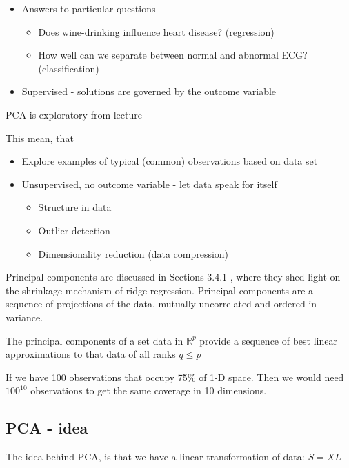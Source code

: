 \begin{itemize}
  \item Answers to particular questions
  \begin{itemize}
    \item Does wine-drinking influence heart disease? (regression)
    \item How well can we separate between normal and abnormal ECG? (classification)
  \end{itemize}
  \item Supervised - solutions are governed by the outcome variable
\end{itemize}

PCA is exploratory from lecture \cite[p.~8]{lecture6}

This mean, that

\begin{itemize}
  \item Explore examples of typical (common) observations based on data set
  \item Unsupervised, no outcome variable - let data speak for itself
  \begin{itemize}
    \item Structure in data
    \item Outlier detection
    \item Dimensionality reduction (data compression)
  \end{itemize}
\end{itemize}

Principal components are discussed in Sections 3.4.1 \cite{friedman2016elements}, where they shed light
on the shrinkage mechanism of ridge regression. Principal components are
a sequence of projections of the data, mutually uncorrelated and ordered
in variance.

The principal components of a set data in $\mathbb{R}^p$ provide a sequence of best linear approximations to that data of all ranks $q \leq p$

If we have 100 observations that occupy 75\% of 1-D space. Then we would need $100^{10} $ observations to get the same coverage in 10 dimensions.

\subsection{PCA - idea}

The idea behind PCA, is that we have a linear transformation of data: $S = XL$\\

